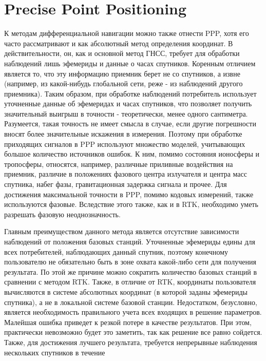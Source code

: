 \documentclass[a4paper,12pt]{report}
\begin{document}
\section{Precise Point Positioning}
\par К методам дифференциальной навигации можно также отнести PPP, хотя его часто рассматривают и как абсолютный метод определения координат. 
В действительности, он, как и основной метод ГНСС, требует для обработки наблюдений лишь эфемериды и данные о часах спутников. Коренным 
отличием является то, что эту информацию приемник берет не со спутников, а извне (например, из какой-нибудь глобальной сети, реже - из 
наблюдений другого приемника). Таким образом, при обработке наблюдений потребитель использует уточненные данные об эфемеридах и часах 
спутников, что позволяет получить значительный выигрыш в точности - теоретически, менее одного сантиметра. Разумеется, такая точность не 
имеет смысла в случае, если другие погрешности вносят более значительные искажения в измерения. Поэтому при обработке приходящих сигналов в 
PPP используют множество моделей, учитывающих большое количество источников ошибок. К ним, помимо состояния ионосферы и тропосферы, относятся, 
например, различные приливные воздействия на приемник, различие в положениях фазового центра излучателя и центра масс спутника, набег фазы, 
гравитационная задержка сигнала и прочее.\cite{karut-stat} Для достижения максимальной точности в PPP, помимо кодовых измерений, 
также используются фазовые. Вследствие этого также, как и в RTK, необходимо уметь разрешать фазовую неоднозначность. \par
Главным преимуществом данного метода является отсутствие зависимости наблюдений от положения базовых станций. Уточненные эфемериды едины для 
всех потребителей, наблюдающих данный спутник, поэтому конечному пользователю не обязательно быть в зоне охвата какой-либо сети для получения 
результата. По этой же причине можно сократить количество базовых станций в сравнении с методом RTK. Также, в отличие от RTK, координаты 
пользователя вычисляются в системе абсолютных координат (в которой заданы эфемериды спутника), а не в локальной системе базовой станции. 
Недостатком, безусловно, является необходимость правильного учета всех входящих в решение параметров. Малейшая ошибка приведет к резкой 
потере в качестве результатов. При этом, практически невозможно будет это заметить, так как решение все равно сойдется.
Также, для достижения лучшего результата, требуется непрерывные наблюдения нескольких спутников в течение 
\end{document}

